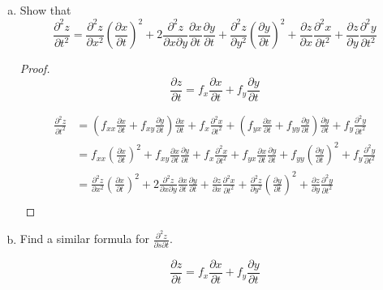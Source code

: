 \documentclass{article}
\begin{document}
    \begin{enumerate}[(a)]
        \item Show that $$\frac{\partial^2 z}{\partial t^2} = \frac{\partial^2 z}{\partial x^2} (\frac{\partial x}{\partial t})^2 + 2 \frac{\partial^2 z}{\partial x \partial y} \frac{\partial x}{\partial t} \frac{\partial y}{\partial t} + \frac{\partial^2 z}{\partial y^2}(\frac{\partial y}{\partial t})^2 + \frac{\partial z}{\partial x}\frac{\partial^2 x}{\partial t^2} + \frac{\partial z}{\partial y}\frac{\partial^2 y}{\partial t^2}$$

        \begin{proof}
            $$\frac{\partial z}{\partial t} = f_x \frac{\partial x}{\partial t} + f_y \frac{\partial y}{\partial t}$$

            $$\begin{aligned}
                \frac{\partial^2 z}{\partial t^2} &= (f_{xx} \frac{\partial x}{\partial t} + f_{xy} \frac{\partial y}{\partial t}) \frac{\partial x}{\partial t} + f_x \frac{\partial^2 x}{\partial t^2} + (f_{yx}\frac{\partial x}{\partial t} + f_{yy}\frac{\partial y}{\partial t})\frac{\partial y}{\partial t} + f_y\frac{\partial^2 y}{\partial t^2} \\
                &= f_{xx}(\frac{\partial x}{\partial t})^2 + f_{xy}\frac{\partial x}{\partial t}\frac{\partial y}{\partial t} + f_x \frac{\partial^2 x}{\partial t^2} + f_{yx}\frac{\partial x}{\partial t}\frac{\partial y}{\partial t} + f_{yy}(\frac{\partial y}{\partial t})^2 + f_y\frac{\partial^2 y}{\partial t^2} \\
                &= \frac{\partial^2 z}{\partial x^2}(\frac{\partial x}{\partial t})^2 + 2\frac{\partial^2 z}{\partial x \partial y}\frac{\partial x}{\partial t}\frac{\partial y}{\partial t} + \frac{\partial z}{\partial x} \frac{\partial^2 x}{\partial t^2} + \frac{\partial^2 z}{\partial y^2}(\frac{\partial y}{\partial t})^2 + \frac{\partial z}{\partial y}\frac{\partial^2 y}{\partial t^2} \\
            \end{aligned}$$
        \end{proof}

        \item Find a similar formula for $\frac{\partial^2 z}{\partial s \partial t}$.

        $$\frac{\partial z}{\partial t} = f_x \frac{\partial x}{\partial t} + f_y \frac{\partial y}{\partial t}$$


\end{enumerate}
\end{document}
